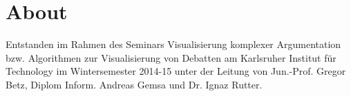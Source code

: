 \documentclass{algo-paper}
\theoremstyle{changebreak}
\begin{document}
  


\cleardoublepage



\listoftodos
\cleardoublepage


\tableofcontents
\cleardoublepage










\chapter*{About}
Entstanden im Rahmen des Seminars Visualisierung komplexer Argumentation bzw. Algorithmen zur Visualisierung von Debatten 
am Karlsruher Institut für Technology im Wintersemester 2014-15 unter der Leitung von 
Jun.-Prof. Gregor Betz, Diplom Inform. Andreas Gemsa und Dr. Ignaz Rutter.
\end{document}
